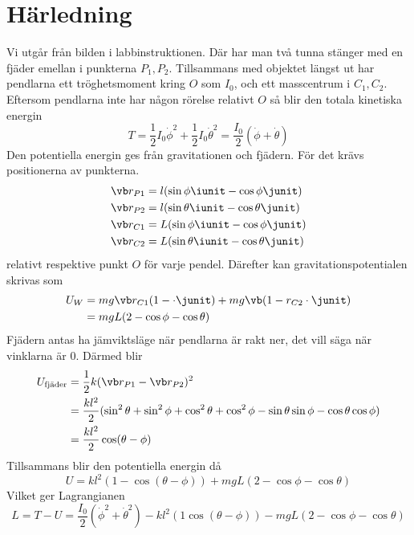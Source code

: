 \section{Härledning}
Vi utgår från bilden i labbinstruktionen. Där har man två tunna stänger med en fjäder emellan i punkterna $P_1,P_2$. Tillsammans med objektet längst ut har pendlarna ett tröghetsmoment kring $O$ som $I_0$, och ett masscentrum i $C_1,C_2$. Eftersom pendlarna inte har någon rörelse relativt $O$ så blir den totala kinetiska energin \begin{equation}
    T = \frac{1}{2}I_0 \dot{\phi}^2 + \frac{1}{2}I_0 \dot{\theta}^2 = \frac{I_0}{2}(\dot{\phi}+\dot{\theta})
\end{equation}
Den potentiella energin ges från gravitationen och fjädern. För det krävs positionerna av punkterna.
\begin{align}
    \vb r_{P1} &= l (\sin\phi\iunit-\cos\phi\junit)\\
    \vb r_{P2} &= l (\sin\theta\iunit-\cos\theta\junit)\\
    \vb r_{C1} &= L (\sin\phi\iunit-\cos\phi\junit)\\
    \vb r_{C2} &= L (\sin\theta\iunit-\cos\theta\junit)\\
\end{align}
relativt respektive punkt $O$ för varje pendel. Därefter kan gravitationspotentialen skrivas som \begin{align}
    U_W &= mg \vb r_{C1}(1-\cdot \junit) + mg \vb(1- r_{C2}\cdot \junit)\\
    &=mgL(2-\cos\phi-\cos\theta)
\end{align}
Fjädern antas ha jämviktsläge när pendlarna är rakt ner, det vill säga när vinklarna är 0. Därmed blir \begin{align}
    U_{\textrm{fjäder}} &= \frac{1}{2}k(\vb r_{P1}-\vb r_{P2})^2 \\ &= \frac{kl^2}{2}(\sin^2\theta+\sin^2\phi+\cos^2\theta+\cos^2\phi-\sin\theta\sin\phi-\cos\theta\cos\phi)\\
    &=\frac{kl^2}{2}\cos(\theta-\phi)
\end{align}
Tillsammans blir den potentiella energin då \begin{equation}
    U = kl^2(1-\cos(\theta-\phi)) + mgL(2-\cos\phi-\cos\theta)
\end{equation}
Vilket ger Lagrangianen \begin{equation}
    L = T-U = \frac{I_0}{2}(\dot{\phi}^2+\dot{\theta}^2) - kl^2(1\cos(\theta-\phi)) -mgL(2-\cos\phi-\cos\theta)
\end{equation}
